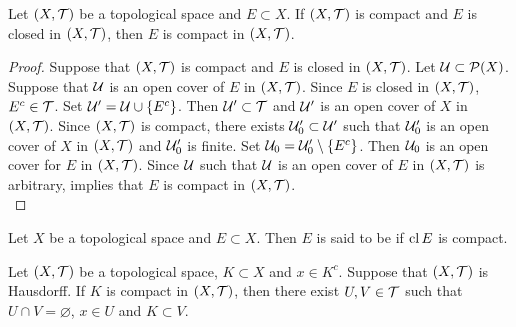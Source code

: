 \documentclass{book}
\begin{document}
	\begin{ex} 
		Let $(X, \mathcal{T})$ be a topological space and $E \subset X$. If $(X, \mathcal{T})$ is compact and $E$ is closed in $(X, \mathcal{T})$, then $E$ is compact in $(X, \mathcal{T})$.
	\end{ex}

	\begin{proof}
		Suppose that $(X, \mathcal{T})$ is compact and $E$ is closed in $(X, \mathcal{T})$. Let $\mathcal{U} \subset \mathcal{P}(X)$. Suppose that $\mathcal{U}$ is an open cover of $E$ in $(X, \mathcal{T})$. Since $E$ is closed in $(X, \mathcal{T})$, $E^c \in \mathcal{T}$. Set $\mathcal{U}' = \mathcal{U} \cup \{E^c\}$. Then $\mathcal{U}' \subset \mathcal{T}$ and $\mathcal{U}'$ is an open cover of $X$ in $(X, \mathcal{T})$.  Since $(X, \mathcal{T})$ is compact, there exists $\mathcal{U}'_0 \subset \mathcal{U}'$ such that $\mathcal{U}'_0$ is an open cover of $X$ in $(X, \mathcal{T})$ and $\mathcal{U}'_0$ is finite. Set $\mathcal{U}_0 = \mathcal{U}'_0 \setminus \{E^c\}$. Then $\mathcal{U}_0$ is an open cover for $E$ in $(X, \mathcal{T})$. Since $\mathcal{U}$ such that $\mathcal{U}$ is an open cover of $E$ in $(X, \mathcal{T})$ is arbitrary,  implies that $E$ is compact in $(X, \mathcal{T})$.
		\\
	\end{proof}
	
	
	
	
	\begin{defn} 
		Let $X$ be a topological space and $E \subset X$. Then $E$ is said to be  if $\operatorname{cl} E$ is compact.
	\end{defn}

	\begin{ex} 
		Let $(X, \mathcal{T})$ be a topological space, $K \subset X$ and $x \in K^c$. Suppose that $(X, \mathcal{T})$ is Hausdorff. If $K$ is compact in $(X, \mathcal{T})$, then there exist $U, V \in \mathcal{T}$ such that $U \cap V = \varnothing$, $x \in U$ and $K \subset V$.
	\end{ex}
\end{document}

